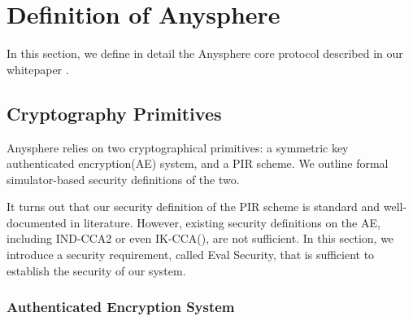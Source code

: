 \section{Definition of Anysphere}
\label{sec:asphr-defn}
In this section, we define in detail the Anysphere core protocol described in our whitepaper \cite{whitepaper}. 
\subsection{Cryptography Primitives}
Anysphere relies on two cryptographical primitives: a symmetric key authenticated encryption(AE) system, and a PIR scheme. We outline formal simulator-based security definitions of the two.

It turns out that our security definition of the PIR scheme is standard and well-documented in literature. However, existing security definitions on the AE, including IND-CCA2 or even IK-CCA(\cite{BBDP01keyprivate}), are not sufficient. In this section, we introduce a security requirement, called Eval Security, that is sufficient to establish the security of our system.
\subsubsection{Authenticated Encryption System}


